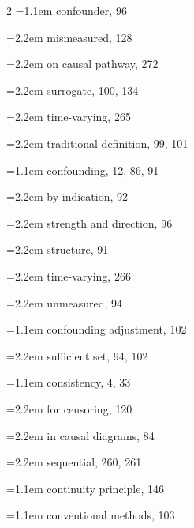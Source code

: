 \begin{multicols}{2}
\hangindent=1.1em confounder, 96\par
\hspace*{1.1em}\hangindent=2.2em mismeasured, 128\par
\hspace*{1.1em}\hangindent=2.2em on causal pathway, 272\par
\hspace*{1.1em}\hangindent=2.2em surrogate, 100, 134\par
\hspace*{1.1em}\hangindent=2.2em time-varying, 265\par
\hspace*{1.1em}\hangindent=2.2em traditional definition, 99, 101\par
\hangindent=1.1em confounding, 12, 86, 91\par
\hspace*{1.1em}\hangindent=2.2em by indication, 92\par
\hspace*{1.1em}\hangindent=2.2em strength and direction, 96\par
\hspace*{1.1em}\hangindent=2.2em structure, 91\par
\hspace*{1.1em}\hangindent=2.2em time-varying, 266\par
\hspace*{1.1em}\hangindent=2.2em unmeasured, 94\par
\hangindent=1.1em confounding adjustment, 102\par
\hspace*{1.1em}\hangindent=2.2em sufficient set, 94, 102\par
\hangindent=1.1em consistency, 4, 33\par
\hspace*{1.1em}\hangindent=2.2em for censoring, 120\par
\hspace*{1.1em}\hangindent=2.2em in causal diagrams, 84\par
\hspace*{1.1em}\hangindent=2.2em sequential, 260, 261\par
\hangindent=1.1em continuity principle, 146\par
\hangindent=1.1em conventional methods, 103\par

\end{multicols}
